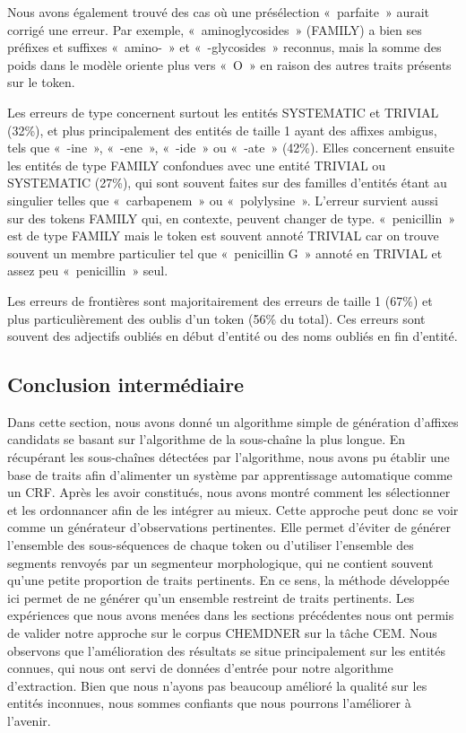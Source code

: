 \documentclass[12pt,a4paper,times,twoside,openright]{report}
\begin{document}
Nous avons également trouvé des cas où une présélection «\ parfaite\ » aurait corrigé une erreur. Par exemple, «\ aminoglycosides\ » (FAMILY) a bien ses préfixes et suffixes «~amino-~» et «~-glycosides~» reconnus, mais la somme des poids dans le modèle oriente plus vers «\ O\ » en raison des autres traits présents sur le token.

Les erreurs de type concernent surtout les entités SYSTEMATIC et TRIVIAL (32\%), et plus principalement des entités de taille 1 ayant des affixes ambigus, tels que «\ -ine\ », «\ -ene\ », «\ -ide\ » ou «\ -ate\ » (42\%). Elles concernent ensuite les entités de type FAMILY confondues avec une entité TRIVIAL ou SYSTEMATIC (27\%), qui sont souvent faites sur des familles d'entités étant au singulier telles que «\ carbapenem\ » ou «\ polylysine\ ». L'erreur survient aussi sur des tokens FAMILY qui, en contexte, peuvent changer de type. «\ penicillin\ » est de type FAMILY mais le token est souvent annoté TRIVIAL car on trouve souvent un membre particulier tel que «\ penicillin G\ » annoté en TRIVIAL et assez peu «\ penicillin\ » seul.

Les erreurs de frontières sont majoritairement des erreurs de taille 1 (67\%) et plus particulièrement des oublis d'un token (56\% du total). Ces erreurs sont souvent des adjectifs oubliés en début d'entité ou des noms oubliés en fin d'entité.



        \subsection{Conclusion intermédiaire}
        \label{subsec:morphology-conclusion}
Dans cette section, nous avons donné un algorithme simple de génération d'affixes candidats se basant sur l'algorithme de la sous-chaîne la plus longue. En récupérant les sous-chaînes détectées par l'algorithme, nous avons pu établir une base de traits afin d'alimenter un système par apprentissage automatique comme un CRF. Après les avoir constitués, nous avons montré comment les sélectionner et les ordonnancer afin de les intégrer au mieux. Cette approche peut donc se voir comme un générateur d'observations pertinentes. Elle permet d'éviter de générer l'ensemble des sous-séquences de chaque token ou d'utiliser l'ensemble des segments renvoyés par un segmenteur morphologique, qui ne contient souvent qu'une petite proportion de traits pertinents. En ce sens, la méthode développée ici permet de ne générer qu'un ensemble restreint de traits pertinents. Les expériences que nous avons menées dans les sections précédentes nous ont permis de valider notre approche sur le corpus CHEMDNER sur la tâche CEM. Nous observons que l'amélioration des résultats se situe principalement sur les entités connues, qui nous ont servi de données d'entrée pour notre algorithme d'extraction. Bien que nous n'ayons pas beaucoup amélioré la qualité sur les entités inconnues, nous sommes confiants que nous pourrons l'améliorer à l'avenir.
\end{document}
